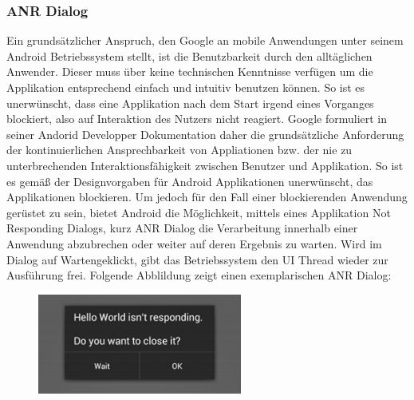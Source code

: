 \documentclass[12pt,oneside,a4paper,bibtotoc,liststotoc]{scrreprt}
\begin{document}
\subsubsection{ANR Dialog}
Ein grundsätzlicher Anspruch, den Google an mobile Anwendungen unter seinem Android Betriebssystem stellt, ist die Benutzbarkeit durch den alltäglichen Anwender. Dieser muss über keine technischen Kenntnisse verfügen um die Applikation entsprechend einfach und intuitiv benutzen können. So ist es unerwünscht, dass eine Applikation nach dem Start irgend eines Vorganges blockiert, also auf Interaktion des Nutzers nicht reagiert. Google formuliert in seiner Andorid Developper Dokumentation daher die grundsätzliche Anforderung der kontinuierlichen Ansprechbarkeit von Appliationen bzw. der nie zu unterbrechenden Interaktionsfähigkeit zwischen Benutzer und Applikation. So ist es gemäß der Designvorgaben für Android Applikationen unerwünscht, das Applikationen blockieren. Um jedoch für den Fall einer blockierenden Anwendung gerüstet zu sein, bietet Android die Möglichkeit, mittels eines Applikation Not Responding Dialogs, kurz ANR Dialog die Verarbeitung innerhalb einer Anwendung abzubrechen oder weiter auf deren Ergebnis zu warten. Wird im Dialog auf \glqq Warten\grqq geklickt, gibt das Betriebssystem den UI Thread wieder zur Ausführung frei. Folgende Abblildung zeigt einen exemplarischen ANR Dialog:
\begin{figure}[H]
  \begin{centering}
    \includegraphics[width=0.6\textwidth]{img/anr-dialog.png}
    \label{ANR Dialog}
  \end{centering}
\end{figure}
\end{document}
